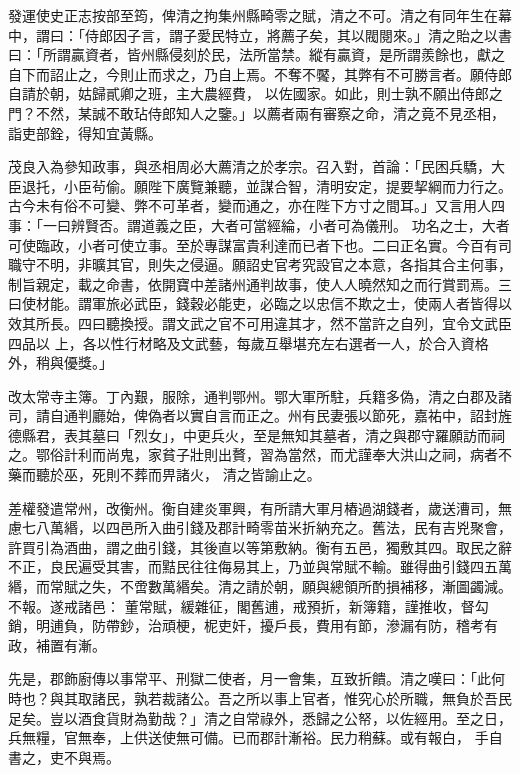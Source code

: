 \begin{pinyinscope}
 發運使史正志按部至筠，俾清之拘集州縣畸零之賦，清之不可。清之有同年生在幕中，謂曰：「侍郎因子言，謂子愛民特立，將薦子矣，其以閥閱來。」清之貽之以書曰：「所謂贏資者，皆州縣侵刻於民，法所當禁。縱有贏資，是所謂羨餘也，獻之自下而詔止之，今則止而求之，乃自上焉。不奪不饜，其弊有不可勝言者。願侍郎自請於朝，姑歸貳卿之班，主大農經費，
 以佐國家。如此，則士孰不願出侍郎之門？不然，某誠不敢玷侍郎知人之鑒。」以薦者兩有審察之命，清之竟不見丞相，詣吏部銓，得知宜黃縣。



 茂良入為參知政事，與丞相周必大薦清之於孝宗。召入對，首論：「民困兵驕，大臣退托，小臣茍偷。願陛下廣覽兼聽，並謀合智，清明安定，提要挈綱而力行之。古今未有俗不可變、弊不可革者，變而通之，亦在陛下方寸之間耳。」又言用人四事：「一曰辨賢否。謂道義之臣，大者可當經綸，小者可為儀刑。
 功名之士，大者可使臨政，小者可使立事。至於專謀富貴利達而已者下也。二曰正名實。今百有司職守不明，非曠其官，則失之侵逼。願詔史官考究設官之本意，各指其合主何事，制旨親定，載之命書，依開寶中差諸州通判故事，使人人曉然知之而行賞罰焉。三曰使材能。謂軍旅必武臣，錢穀必能吏，必臨之以忠信不欺之士，使兩人者皆得以效其所長。四曰聽換授。謂文武之官不可用違其才，然不當許之自列，宜令文武臣四品以
 上，各以性行材略及文武藝，每歲互舉堪充左右選者一人，於合入資格外，稍與優獎。」



 改太常寺主簿。丁內艱，服除，通判鄂州。鄂大軍所駐，兵籍多偽，清之白郡及諸司，請自通判廳始，俾偽者以實自言而正之。州有民妻張以節死，嘉祐中，詔封旌德縣君，表其墓曰「烈女」，中更兵火，至是無知其墓者，清之與郡守羅願訪而祠之。鄂俗計利而尚鬼，家貧子壯則出贅，習為當然，而尤謹奉大洪山之祠，病者不藥而聽於巫，死則不葬而畀諸火，
 清之皆諭止之。



 差權發遣常州，改衡州。衡自建炎軍興，有所請大軍月樁過湖錢者，歲送漕司，無慮七八萬緡，以四邑所入曲引錢及郡計畸零苗米折納充之。舊法，民有吉兇聚會，許買引為酒曲，謂之曲引錢，其後直以等第敷納。衡有五邑，獨敷其四。取民之辭不正，良民遍受其害，而黠民往往侮易其上，乃並與常賦不輸。雖得曲引錢四五萬緡，而常賦之失，不啻數萬緡矣。清之請於朝，願與總領所酌損補移，漸圖蠲減。不報。遂戒諸邑：
 董常賦，緩雜征，閣舊逋，戒預折，新簿籍，謹推收，督勾銷，明逋負，防帶鈔，治頑梗，柅吏奸，擾戶長，費用有節，滲漏有防，稽考有政，補置有漸。



 先是，郡飾廚傳以事常平、刑獄二使者，月一會集，互致折饋。清之嘆曰：「此何時也？與其取諸民，孰若裁諸公。吾之所以事上官者，惟究心於所職，無負於吾民足矣。豈以酒食貨財為勤哉？」清之自常祿外，悉歸之公帑，以佐經用。至之日，兵無糧，官無奉，上供送使無可備。已而郡計漸裕。民力稍蘇。或有報白，
 手自書之，吏不與焉。




\end{pinyinscope}
